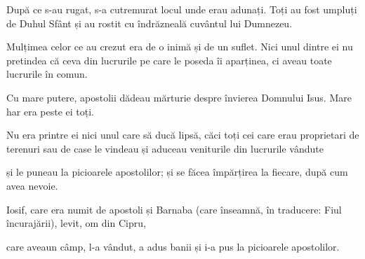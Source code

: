 {\par }{\PP {}După ce s-au rugat, s-a cutremurat locul unde erau adunați. Toți au fost umpluți de Duhul Sfânt și au rostit cu îndrăzneală cuvântul lui Dumnezeu.


\par }{\PP {}Mulțimea celor ce au crezut era de o inimă și de un suflet. Nici unul dintre ei nu pretindea că ceva din lucrurile pe care le poseda îi aparținea, ci aveau toate lucrurile în comun.

Cu mare putere, apostolii dădeau mărturie despre învierea Domnului Isus. Mare har era peste ei toți.

Nu era printre ei nici unul care să ducă lipsă, căci toți cei care erau proprietari de terenuri sau de case le vindeau și aduceau veniturile din lucrurile vândute

și le puneau la picioarele apostolilor; și se făcea împărțirea la fiecare, după cum avea nevoie.


\par }{\PP {}Iosif, care era numit de apostoli și Barnaba (care înseamnă, în traducere: Fiul încurajării), levit, om din Cipru,

care aveaun câmp, l-a vândut, a adus banii și i-a pus la picioarele apostolilor.



\par }
